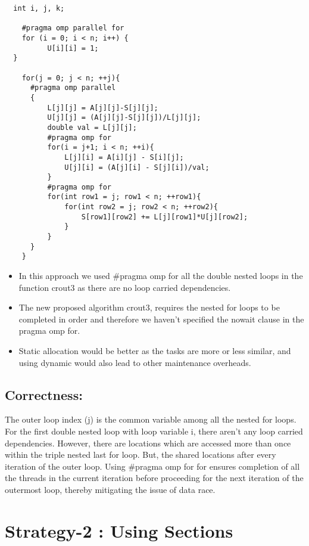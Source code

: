 \documentclass[12pt]{article}
\begin{document}
\begin{verbatim}
  int i, j, k;

	#pragma omp parallel for
	for (i = 0; i < n; i++) {
		  U[i][i] = 1;
  }
  
	for(j = 0; j < n; ++j){
      #pragma omp parallel
      {	
          L[j][j] = A[j][j]-S[j][j];
          U[j][j] = (A[j][j]-S[j][j])/L[j][j];
          double val = L[j][j];
          #pragma omp for
          for(i = j+1; i < n; ++i){
              L[j][i] = A[i][j] - S[i][j];
              U[j][i] = (A[j][i] - S[j][i])/val;
          }
          #pragma omp for
          for(int row1 = j; row1 < n; ++row1){
              for(int row2 = j; row2 < n; ++row2){
                  S[row1][row2] += L[j][row1]*U[j][row2];
              }
          }
      }
	}

\end{verbatim}
  \begin{itemize}
    \item In this approach we used \#pragma omp for all the double nested loops in 
    the function crout3 as there are no loop carried dependencies.
    \item The new proposed algorithm crout3, requires the nested for loops to be completed 
    in order and therefore we haven't specified the nowait clause in the pragma 
    omp for.
    \item Static allocation would be better as the tasks are more or less 
    similar, and using dynamic would also lead to other maintenance overheads.  
  \end{itemize}
    
\subsection*{Correctness:}

  The outer loop index (j) is the common variable among all the nested for 
  loops. For the first double nested loop with loop variable i, there aren't
  any loop carried dependencies. However, there are locations which are accessed
  more than once within the triple nested last for loop. But, the shared locations
  after every iteration of the outer loop. Using \#pragma omp for for ensures completion of all
  the threads in the current iteration before proceeding for the next iteration of the outermost
  loop, thereby mitigating the issue of data race.

\section*{Strategy-2 : Using Sections}
\end{document}
